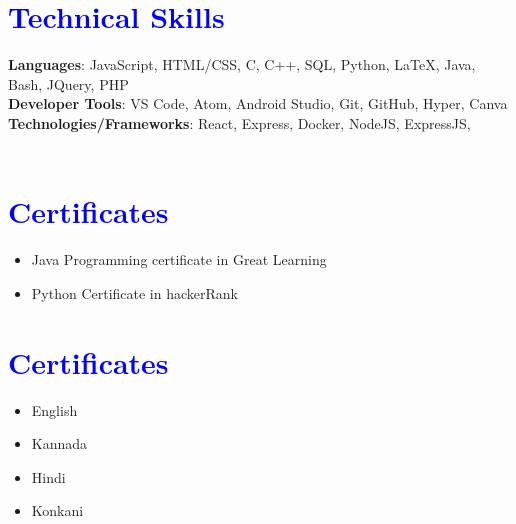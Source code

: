 \documentclass[letterpaper,11pt]{article}
\newcommand{\resumeItem}[1]{
  \item\small{
    {#1 \vspace{-2pt}}
  }
}
\newcommand{\resumeItemListStart}{\begin{itemize}}
\newcommand{\resumeItemListEnd}{\end{itemize}\vspace{-5pt}}
\begin{document}
        \section{\textcolor{blue}{Technical Skills}}
            \vspace{2pt}
        \begin{itemize}[leftmargin=0.0in, label={}]
              \normalsize{\item{
              \textbf{Languages}{: JavaScript, HTML/CSS, C, C++, SQL, Python, LaTeX, Java, Bash, JQuery, PHP} \\
        	 \vspace{4pt}
              \textbf{Developer Tools}{: VS Code, Atom, Android Studio, Git, GitHub, Hyper, Canva} \\
        	\vspace{4pt}
              \textbf{Technologies/Frameworks}{: React, Express, Docker, NodeJS, ExpressJS,} \\
            \vspace{4pt}
              \
            }}
        \section{\textcolor{blue}{Certificates}}
            \resumeItemListStart
                \resumeItem{Java Programming certificate in Great Learning}
                \resumeItem{Python Certificate in hackerRank}
              \resumeItemListEnd
        \section{\textcolor{blue}{Certificates}}
            \resumeItemListStart
                \resumeItem{English}
                \resumeItem{Kannada}
                \resumeItem{Hindi}
                \resumeItem{Konkani}


              \resumeItemListEnd
        \end{itemize}
    
\end{document}
